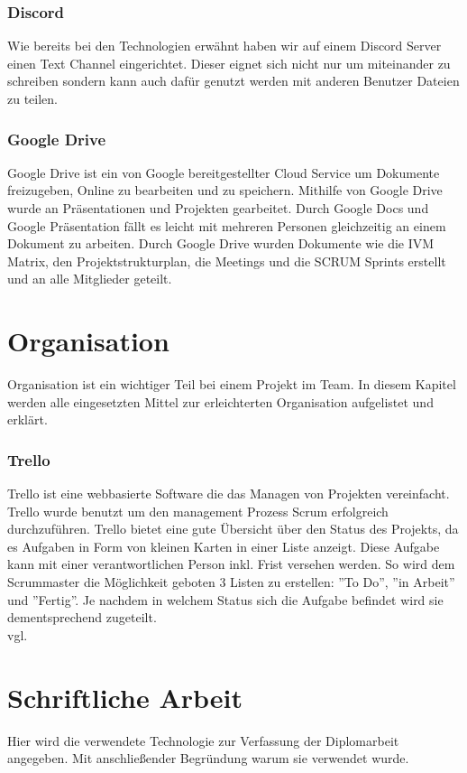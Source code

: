 \subsubsection {Discord}
\label{sec:Discord}
Wie bereits bei den Technologien erwähnt haben wir auf einem Discord Server einen Text Channel eingerichtet. Dieser eignet sich nicht nur um miteinander zu schreiben sondern kann auch dafür genutzt werden mit anderen Benutzer Dateien zu teilen. 
\subsubsection {Google Drive}
\label{sec:GoogleDrive}
Google Drive ist ein von Google bereitgestellter Cloud Service um Dokumente freizugeben, Online zu bearbeiten und zu speichern.
Mithilfe von Google Drive wurde an Präsentationen und Projekten gearbeitet. Durch Google Docs und Google Präsentation fällt es leicht mit mehreren Personen gleichzeitig an einem Dokument zu arbeiten. Durch Google Drive wurden Dokumente wie die IVM Matrix, den Projektstrukturplan, die Meetings und die SCRUM Sprints erstellt und an alle Mitglieder geteilt. 
\section{Organisation}
\label{sec:Organisation}
Organisation ist ein wichtiger Teil bei einem Projekt im Team. In diesem Kapitel werden alle eingesetzten Mittel zur erleichterten Organisation aufgelistet und erklärt.
\subsubsection {Trello}
\label{sec:Trello}
Trello ist eine webbasierte Software die das Managen von Projekten vereinfacht. Trello wurde benutzt um den management Prozess Scrum erfolgreich durchzuführen. Trello bietet eine gute Übersicht über den Status des Projekts, da es Aufgaben in Form von kleinen Karten in einer Liste anzeigt. Diese Aufgabe kann mit einer verantwortlichen Person inkl. Frist versehen werden. So wird dem Scrummaster die Möglichkeit geboten 3 Listen zu erstellen: ''To Do'', ''in Arbeit'' und ''Fertig''. Je nachdem in welchem Status sich die Aufgabe befindet wird sie dementsprechend zugeteilt. \\vgl. \textcite{trello} 
\section{Schriftliche Arbeit}
\label{sec:TechSchriftlicheArbeit}
Hier wird die verwendete Technologie zur Verfassung der Diplomarbeit angegeben. Mit anschließender Begründung warum sie verwendet wurde.
